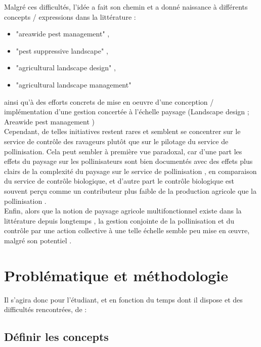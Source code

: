 \documentclass[11pt,a4paper,final]{article}
\begin{document}
Malgré ces difficultés, l'idée a fait son chemin et a donné naissance à différents concepts / expressions dans la littérature :
\begin{itemize}
\medskip 
\item "areawide pest management" \cite{brevault_pest_2019},
\item "pest suppressive landscape" \cite{parry_use_2012},
\item "agricultural landscape design" \cite{landis_designing_2017},
\item "agricultural landscape management"
\medskip 
\end{itemize}

ainsi qu'à des efforts concrets de mise en oeuvre d'une conception / implémentation d'une gestion concertée à l'échelle paysage (Landscape design \cite{steingrover_designing_2010} ; Areawide pest management \cite{giles_areawide_2008}) \\

Cependant, de telles initiatives restent rares et semblent se concentrer sur le service de contrôle des ravageurs plutôt que sur le pilotage du service de pollinisation. Cela peut sembler à première vue paradoxal, car d'une part les effets du paysage sur les pollinisateurs sont bien documentés avec des effets plus clairs de la complexité du paysage sur le service de pollinisation \cite{kennedy_global_2013, karp_crop_2018}, en comparaison du service de contrôle biologique, et d'autre part le contrôle biologique est souvent perçu comme un contributeur plus faible de la production agricole que la pollinisation \cite{zhang_european_2018}. \\

Enfin, alors que la notion de paysage agricole multifonctionnel existe dans la littérature depuis longtemps \cite{hatt_spatial_2018}, la gestion conjointe de la pollinisation et du contrôle par une action collective à une telle échelle semble peu mise en œuvre, malgré son potentiel \cite{dainese_high_2017}.

\section{Problématique et méthodologie}

Il s'agira donc pour l'étudiant, et en fonction du temps dont il dispose et des difficultés rencontrées, de :

\subsection{Définir les concepts}
\end{document}
